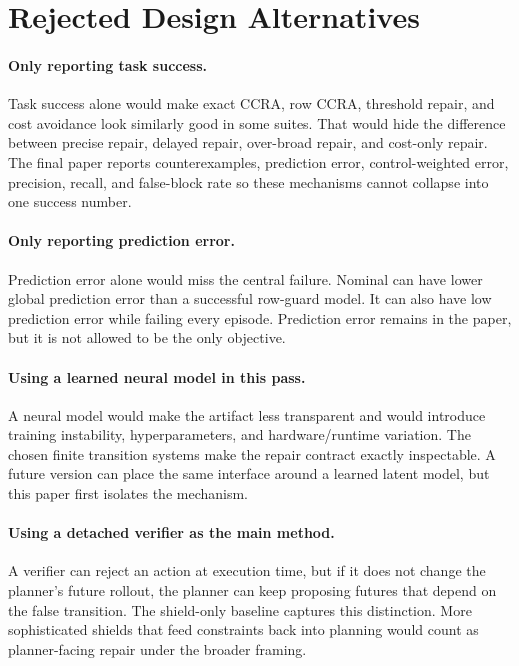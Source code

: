 \documentclass{article}
\begin{document}
\section{Rejected Design Alternatives}

\paragraph{Only reporting task success.}
Task success alone would make exact CCRA, row CCRA, threshold repair, and cost avoidance look similarly good in some suites. That would hide the difference between precise repair, delayed repair, over-broad repair, and cost-only repair. The final paper reports counterexamples, prediction error, control-weighted error, precision, recall, and false-block rate so these mechanisms cannot collapse into one success number.

\paragraph{Only reporting prediction error.}
Prediction error alone would miss the central failure. Nominal can have lower global prediction error than a successful row-guard model. It can also have low prediction error while failing every episode. Prediction error remains in the paper, but it is not allowed to be the only objective.

\paragraph{Using a learned neural model in this pass.}
A neural model would make the artifact less transparent and would introduce training instability, hyperparameters, and hardware/runtime variation. The chosen finite transition systems make the repair contract exactly inspectable. A future version can place the same interface around a learned latent model, but this paper first isolates the mechanism.

\paragraph{Using a detached verifier as the main method.}
A verifier can reject an action at execution time, but if it does not change the planner's future rollout, the planner can keep proposing futures that depend on the false transition. The shield-only baseline captures this distinction. More sophisticated shields that feed constraints back into planning would count as planner-facing repair under the broader framing.
\end{document}
